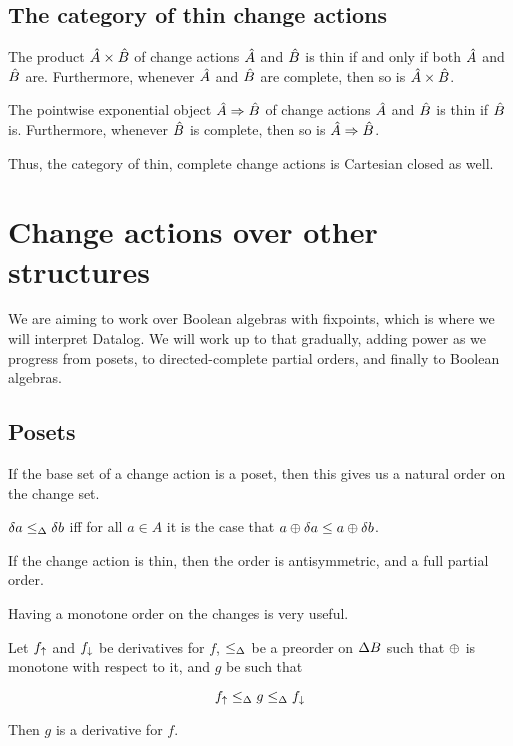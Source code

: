 \subsection{The category of thin change actions}

\begin{prop}
  The product $\hat{A} \times \hat{B}$ of change actions $\hat{A}$ and $\hat{B}$ is thin if and only if both $\hat{A}$ and $\hat{B}$ are.
  Furthermore, whenever $\hat{A}$ and $\hat{B}$ are complete, then so is $\hat{A} \times \hat{B}$.

  The pointwise exponential object $\hat{A} \Rightarrow \hat{B}$ of change actions $\hat{A}$ and $\hat{B}$ is
  thin if $\hat{B}$ is. Furthermore, whenever $\hat{B}$ is complete, then so is $\hat{A} \Rightarrow \hat{B}$.
\end{prop}

Thus, the category of thin, complete change actions is Cartesian closed as well.

\section{Change actions over other structures}
\label{sec:moreStructures}

We are aiming to work over Boolean algebras with fixpoints, which is where we
will interpret Datalog. We will work up to that gradually, adding power as we
progress from posets, to directed-complete partial orders, and
finally to Boolean algebras.

\subsection{Posets}

If the base set of a change action is a poset, then this gives us a natural
order on the change set.

\begin{defn}
  $\delta a \leq_\Delta \delta b$ iff for all $a \in A$ it is the case that $a \oplus \delta a \leq a \oplus \delta b$.
\end{defn}

If the change action is thin, then the order is antisymmetric, and a
full partial order.

Having a monotone order on the changes is very useful.

\begin{thm}
  \label{thm:sandwich}
  Let $f_\uparrow$ and $f_\downarrow$ be derivatives for $f$, $\leq_\Delta$ be a preorder on $\Delta B$ such that $\oplus$ is monotone with
  respect to it, and $g$ be such that

  \begin{displaymath}
    f_\uparrow \leq_\Delta g \leq_\Delta f_\downarrow
  \end{displaymath}

  Then $g$ is a derivative for $f$.
\end{thm}

